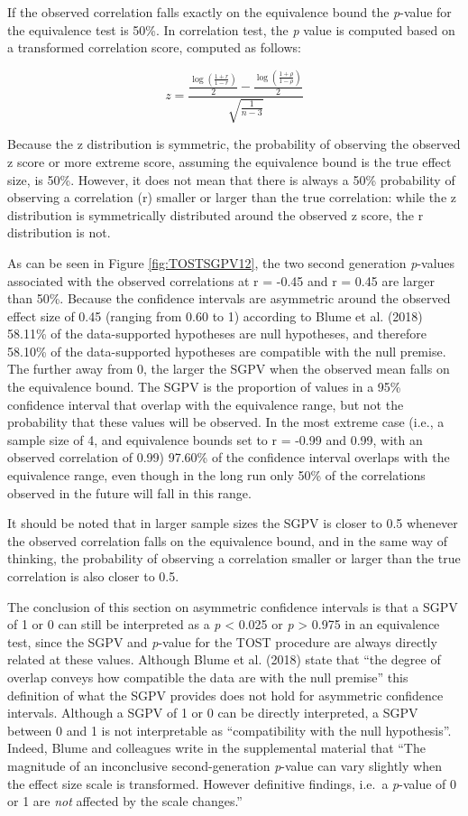 \documentclass[,man,floatsintext]{apa6}
\begin{document}
If the observed correlation falls exactly on the equivalence bound the \emph{p}-value for the equivalence test is 50\%. In correlation test, the \emph{p} value is computed based on a transformed correlation score, computed as follows:

\[
z = \frac{\frac{\log(\frac{1 + r}{ 1 - r})}{2} - \frac{\log(\frac{1 + \rho}{ 1 - \rho})}{2}}{\sqrt{\frac{1}{n-3}}}
\]

Because the z distribution is symmetric, the probability of observing the observed z score or more extreme score, assuming the equivalence bound is the true effect size, is 50\%. However, it does not mean that there is always a 50\% probability of observing a correlation (r) smaller or larger than the true correlation: while the z distribution is symmetrically distributed around the observed z score, the r distribution is not.

As can be seen in Figure \ref{fig:TOSTSGPV12}, the two second generation \emph{p}-values associated with the observed correlations at r = -0.45 and r = 0.45 are larger than 50\%. Because the confidence intervals are asymmetric around the observed effect size of 0.45 (ranging from 0.60 to 1) according to Blume et al. (2018) 58.11\% of the data-supported hypotheses are null hypotheses, and therefore 58.10\% of the data-supported hypotheses are compatible with the null premise. The further away from 0, the larger the SGPV when the observed mean falls on the equivalence bound. The SGPV is the proportion of values in a 95\% confidence interval that overlap with the equivalence range, but not the probability that these values will be observed. In the most extreme case (i.e., a sample size of 4, and equivalence bounds set to r = -0.99 and 0.99, with an observed correlation of 0.99) 97.60\% of the confidence interval overlaps with the equivalence range, even though in the long run only 50\% of the correlations observed in the future will fall in this range.

It should be noted that in larger sample sizes the SGPV is closer to 0.5 whenever the observed correlation falls on the equivalence bound, and in the same way of thinking, the probability of observing a correlation smaller or larger than the true correlation is also closer to 0.5.

The conclusion of this section on asymmetric confidence intervals is that a SGPV of 1 or 0 can still be interpreted as a \emph{p} \textless{} 0.025 or \emph{p} \textgreater{} 0.975 in an equivalence test, since the SGPV and \emph{p}-value for the TOST procedure are always directly related at these values. Although Blume et al. (2018) state that \enquote{the degree of overlap conveys how compatible the data are with the null premise} this definition of what the SGPV provides does not hold for asymmetric confidence intervals. Although a SGPV of 1 or 0 can be directly interpreted, a SGPV between 0 and 1 is not interpretable as \enquote{compatibility with the null hypothesis}. Indeed, Blume and colleagues write in the supplemental material that \enquote{The magnitude of an inconclusive second-generation \emph{p}-value can vary slightly when the effect size scale is transformed. However definitive findings, i.e.~a \emph{p}-value of 0 or 1 are \emph{not} affected by the scale changes.}
\end{document}
